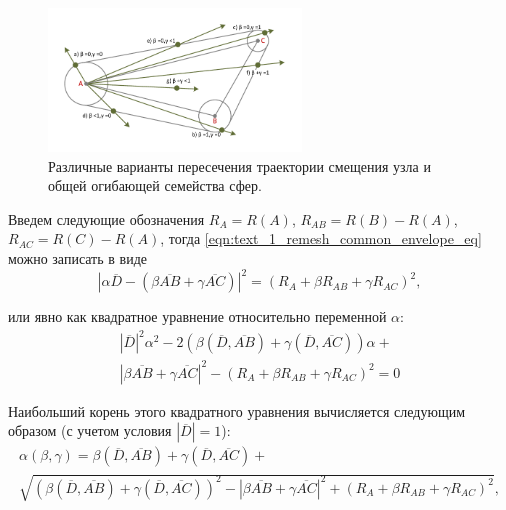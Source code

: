 \begin{figure}[ht]
\centering
\includegraphics[width=0.6\textwidth]{./pics/text_1_remesh_common_envelope/triangle2.pdf}
\singlespacing
{}\caption{Различные варианты пересечения траектории смещения узла и общей огибающей семейства сфер.}
\label{fig:text_1_remesh_common_envelope_2}
\end{figure}

Введем следующие обозначения $R_A = R(A)$, $R_{AB} = R(B) - R(A)$, $R_{AC} = R(C) - R(A)$, тогда \eqref{eqn:text_1_remesh_common_envelope_eq} можно записать в виде
\begin{equation}
	|\alpha \overline{D} - (\beta \overline{AB} + \gamma \overline{AC})|^2 = (R_A + \beta R_{AB} + \gamma R_{AC})^2,
\end{equation}

или явно как квадратное уравнение относительно переменной $\alpha$:
\begin{multline}
	|\overline{D}|^2 \alpha^2 - 2(\beta (\overline{D}, \overline{AB}) + \gamma (\overline{D}, \overline{AC})) \alpha + \\
	|\beta \overline{AB} + \gamma \overline{AC}|^2 - (R_A + \beta R_{AB} + \gamma R_{AC})^2 = 0
\end{multline}

Наибольший корень этого квадратного уравнения вычисляется следующим образом (с учетом условия $|\overline{D}| = 1$):
\begin{multline}
	\alpha(\beta, \gamma) = \beta (\overline{D}, \overline{AB}) + \gamma (\overline{D}, \overline{AC}) + \\
	\sqrt{(\beta (\overline{D}, \overline{AB}) + \gamma (\overline{D}, \overline{AC}))^2 - |\beta \overline{AB} + \gamma \overline{AC}|^2 + (R_A + \beta R_{AB} + \gamma R_{AC})^2},
\end{multline}


